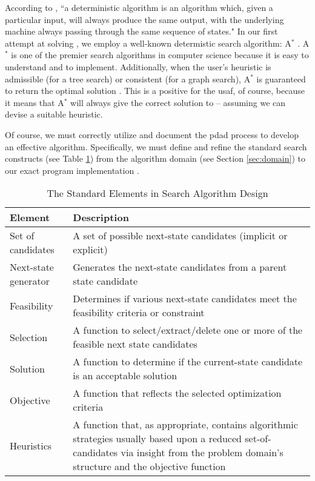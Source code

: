 \documentclass[../main.tex]{subfiles}
\begin{document}
According to \cite{wikipedia:determinism}, ``a deterministic algorithm is an algorithm which, given a particular input, will always produce the same output, with the underlying machine always passing through the same sequence of states." In our first attempt at solving \prob, we employ a well-known determistic search algorithm: A$^*$ \cite{Hart1968}. A$^*$ is one of the premier search algorithms in computer science because it is easy to understand and to implement. Additionally, when the user's heuristic is admissible (for a tree search) or consistent (for a graph search), A$^*$ is guaranteed to return the optimal solution \cite{handout:heuristics, Russell2009, Pearl1984}. This is a positive for the \ac{usaf}, of course, because it means that A$^*$ will always give the correct solution to \probs -- assuming we can devise a suitable heuristic.

Of course, we must correctly utilize and document the \ac{pdad} process to develop an effective algorithm. Specifically, we must define and refine the standard search constructs (see Table \ref{tab:search-constructs}) from the algorithm domain (see Section \ref{sec:domain}) to our exact program implementation \cite{handout:lecture2}.

\begin{table}
\caption{The Standard Elements in Search Algorithm Design}
\centering
\label{tab:search-constructs}
\begin{tabularx}{\columnwidth}{|l|X|}
\hline
\textbf{Element}     & \textbf{Description} \\
\hline
Set of candidates    & A set of possible next-state candidates (implicit or explicit) \\
Next-state generator & Generates the next-state candidates from a parent state candidate \\
Feasibility          & Determines if various next-state candidates meet the feasibility criteria or constraint \\
Selection            & A function to select/extract/delete one or more of the feasible next state candidates \\
Solution             & A function to determine if the current-state candidate is an acceptable solution \\
Objective            & A function that reflects the selected optimization criteria \\
Heuristics           & A function that, as appropriate, contains algorithmic strategies usually based upon a reduced set-of-candidates via insight from the problem domain's structure and the objective function \\
\hline
\end{tabularx}
\end{table}
\end{document}
